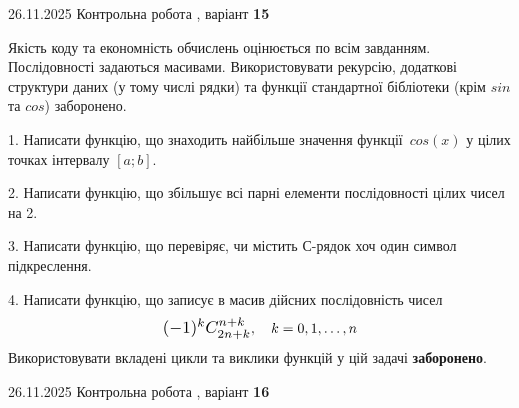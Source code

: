 \documentclass[11pt, ukrainian]{article}
\begin{document}
{{{{{{{{{{{{{{\begin {large}
\vspace{2mm}

\end{large}
\vspace{20mm}


{{26.11.2025 Контрольна робота , варіант  \No \textbf { 15 }\par}}


{
Якість коду та економність обчислень оцінюється по всім завданням. Послідовності задаються масивами. Використовувати рекурсію, додаткові структури даних (у тому числі рядки) та функції стандартної бібліотеки (крім $sin$ та $cos$) заборонено.

\vspace{2mm}

\begin {large}
1. Написати функцію, що знаходить найбільше значення функції~$cos(x)$ у цілих точках інтервалу $[a; b]$.

\vspace{2mm}


2. Написати функцію, що збільшує всі парні елементи послідовності цілих чисел на 2.

\vspace{2mm}


3. Написати функцію, що перевіряє, чи містить С-рядок хоч один символ підкреслення.

\vspace{2mm}


4. 
Написати функцію, що записує в масив дійсних послідовність чисел
$$\scalebox{1.2}{$(-1)^{k}C_{2n+k}^{n+k}$}, \quad k=0,1,\ldots,n$$
\quad Використовувати вкладені цикли та виклики функцій у цій задачі \textbf{заборонено}.

\vspace{2mm}

\end{large}
\newpage
{{26.11.2025 Контрольна робота , варіант  \No \textbf { 16 }\par}}

}}}}}}}}}}}}}}}
\end{document}
